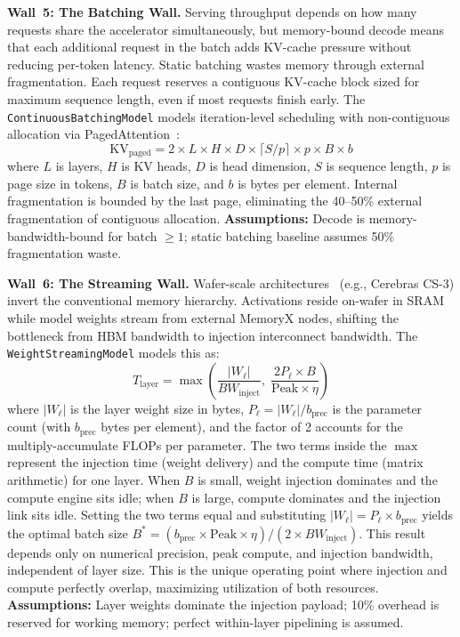 \documentclass[10pt,twocolumn]{article}
\begin{document}
\textbf{Wall~5: The Batching Wall.} Serving throughput depends on how many requests share the accelerator simultaneously, but memory-bound decode means that each additional request in the batch adds KV-cache pressure without reducing per-token latency. Static batching wastes memory through external fragmentation. Each request reserves a contiguous KV-cache block sized for maximum sequence length, even if most requests finish early. The \texttt{ContinuousBatchingModel} models iteration-level scheduling with non-contiguous allocation via PagedAttention~\citep{kwon2023}:
\begin{equation}
\label{eq:pagedkv}
\text{KV}_{\text{paged}} = 2 \times L \times H \times D \times \lceil S / p \rceil \times p \times B \times b
\end{equation}
where $L$ is layers, $H$ is KV heads, $D$ is head dimension, $S$ is sequence length, $p$ is page size in tokens, $B$ is batch size, and $b$ is bytes per element. Internal fragmentation is bounded by the last page, eliminating the 40--50\% external fragmentation of contiguous allocation. \textbf{Assumptions:} Decode is memory-bandwidth-bound for batch $\geq 1$; static batching baseline assumes 50\% fragmentation waste.

\textbf{Wall~6: The Streaming Wall.} Wafer-scale architectures~\citep{lie2022cerebras} (e.g., Cerebras CS-3) invert the conventional memory hierarchy. Activations reside on-wafer in SRAM while model weights stream from external MemoryX nodes, shifting the bottleneck from HBM bandwidth to injection interconnect bandwidth. The \texttt{WeightStreamingModel} models this as:
\begin{equation}
\label{eq:weightstream}
T_{\text{layer}} = \max\!\left(\frac{|W_{\ell}|}{BW_{\text{inject}}},\; \frac{2P_{\ell} \times B}{\text{Peak} \times \eta}\right)
\end{equation}
where $|W_{\ell}|$ is the layer weight size in bytes, $P_{\ell} = |W_{\ell}| / b_{\text{prec}}$ is the parameter count (with $b_{\text{prec}}$ bytes per element), and the factor of 2 accounts for the multiply-accumulate FLOPs per parameter. The two terms inside the $\max$ represent the injection time (weight delivery) and the compute time (matrix arithmetic) for one layer. When $B$ is small, weight injection dominates and the compute engine sits idle; when $B$ is large, compute dominates and the injection link sits idle. Setting the two terms equal and substituting $|W_{\ell}| = P_{\ell} \times b_{\text{prec}}$ yields the optimal batch size $B^{*} = (b_{\text{prec}} \times \text{Peak} \times \eta) / (2 \times BW_{\text{inject}})$. This result depends only on numerical precision, peak compute, and injection bandwidth, independent of layer size. This is the unique operating point where injection and compute perfectly overlap, maximizing utilization of both resources. \textbf{Assumptions:} Layer weights dominate the injection payload; 10\% overhead is reserved for working memory; perfect within-layer pipelining is assumed.
\end{document}
